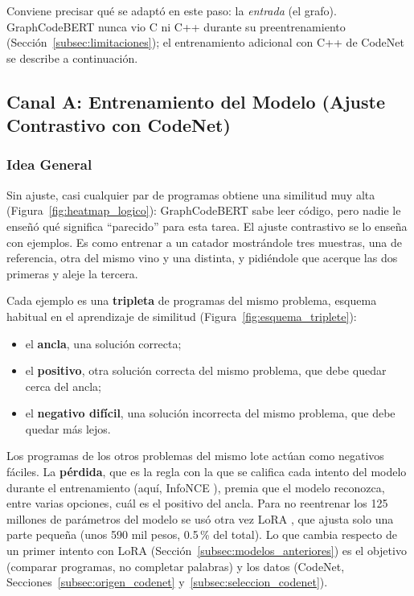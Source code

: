 Conviene precisar qué se adaptó en este paso: la \emph{entrada} (el grafo). GraphCodeBERT nunca vio C ni C++ durante su preentrenamiento (Sección~\ref{subsec:limitaciones}); el entrenamiento adicional con C++ de CodeNet se describe a continuación.

\subsection{Canal A: Entrenamiento del Modelo (Ajuste Contrastivo con CodeNet)}
\label{subsec:ajuste_contrastivo}

\subsubsection{Idea General}
Sin ajuste, casi cualquier par de programas obtiene una similitud muy alta (Figura~\ref{fig:heatmap_logico}): GraphCodeBERT sabe leer código, pero nadie le enseñó qué significa ``parecido'' para esta tarea. El ajuste contrastivo se lo enseña con ejemplos. Es como entrenar a un catador mostrándole tres muestras, una de referencia, otra del mismo vino y una distinta, y pidiéndole que acerque las dos primeras y aleje la tercera.

Cada ejemplo es una \textbf{tripleta} de programas del mismo problema, esquema habitual en el aprendizaje de similitud \cite{Schroff2015FaceNet} (Figura~\ref{fig:esquema_triplete}):

\begin{itemize}
    \item el \textbf{ancla}, una solución correcta;
    \item el \textbf{positivo}, otra solución correcta del mismo problema, que debe quedar cerca del ancla;
    \item el \textbf{negativo difícil}, una solución incorrecta del mismo problema, que debe quedar más lejos.
\end{itemize}

Los programas de los otros problemas del mismo lote actúan como negativos fáciles. La \textbf{pérdida}, que es la regla con la que se califica cada intento del modelo durante el entrenamiento (aquí, InfoNCE \cite{Oord2018InfoNCE}), premia que el modelo reconozca, entre varias opciones, cuál es el positivo del ancla. Para no reentrenar los 125 millones de parámetros del modelo se usó otra vez LoRA \cite{Hu2022LoRA}, que ajusta solo una parte pequeña (unos 590 mil pesos, 0.5\,\% del total). Lo que cambia respecto de un primer intento con LoRA (Sección~\ref{subsec:modelos_anteriores}) es el objetivo (comparar programas, no completar palabras) y los datos (CodeNet, Secciones~\ref{subsec:origen_codenet} y~\ref{subsec:seleccion_codenet}).

